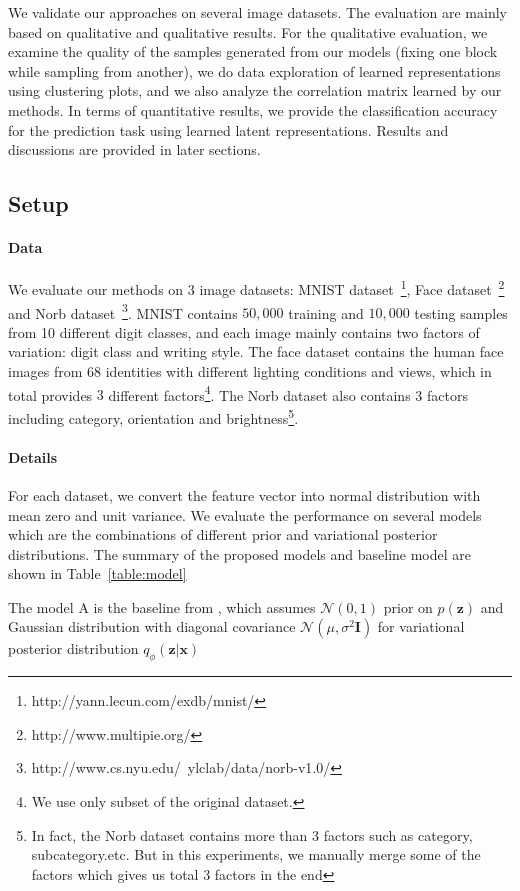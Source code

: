 We validate our approaches on several image datasets.  The evaluation are mainly based on qualitative and qualitative results. For the qualitative evaluation, we examine the quality of the samples generated from our models (fixing one block while sampling from another), we do data exploration of learned representations using clustering plots, and we also analyze the correlation matrix learned by our methods. In terms of quantitative results, we provide the classification accuracy for the prediction task using learned latent representations. Results and discussions are provided in later sections.

\subsection{Setup}
\paragraph{Data} We evaluate our methods on $3$ image datasets: MNIST dataset~\footnote{http://yann.lecun.com/exdb/mnist/}, Face dataset~\footnote{http://www.multipie.org/} and Norb dataset~\footnote{http://www.cs.nyu.edu/~ylclab/data/norb-v1.0/}. MNIST contains $50,000$ training and $10,000$ testing samples from 10 different digit classes, and each image mainly contains two factors of variation: digit class and writing style. The face dataset contains the human face images from $68$ identities with different lighting conditions and views, which in total provides $3$ different factors\footnote{We use only subset of the original dataset.}. The Norb dataset also contains 3 factors including category, orientation and brightness\footnote{In fact, the Norb dataset contains more than 3 factors such as category, subcategory.etc. But in this experiments, we manually merge some of the factors which gives us total 3 factors in the end}.

\paragraph{Details} For each dataset, we convert the feature vector into normal distribution with mean zero and unit variance. We evaluate the performance on several models which are the combinations of different prior and variational posterior distributions. The summary of the proposed models and baseline model are shown in Table~\ref{table:model}

The model A is the baseline from \cite{kingma2013auto}, which assumes $\mathcal{N}(0,1)$ prior on $p(\mathbf{z})$ and Gaussian distribution with diagonal covariance $\mathcal{N}(\mu, \sigma^2\mathbf{I})$ for variational posterior distribution $q_{\phi}(\mathbf{z}|\mathbf{x})$

